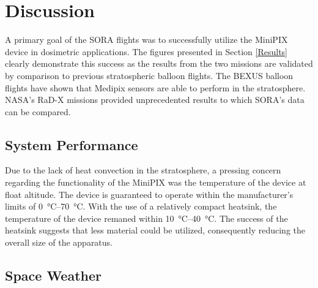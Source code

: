 \section{Discussion}
\label{Discussion}
A primary goal of the SORA flights was to successfully utilize the MiniPIX device in dosimetric applications.
The figures presented in Section \ref{Results} clearly demonstrate this success as the results from the two missions are validated by comparison to previous stratospheric balloon flights.
The BEXUS \cite{bexus} balloon flights have shown that Medipix sensors are able to perform in the stratosphere.
NASA's RaD-X missions \cite{rad-x} provided unprecedented results to which SORA's data can be compared.

\subsection{System Performance}
Due to the lack of heat convection in the stratosphere, a pressing concern regarding the functionality of the MiniPIX was the temperature of the device at float altitude. 
The device is guaranteed to operate within the manufacturer's limits of \SIrange{0}{70}{\celsius}.
With the use of a relatively compact heatsink, the temperature of the device remaned within \SIrange{10}{40}{\celsius}.
The success of the heatsink suggests that less material could be utilized, consequently reducing the overall size of the apparatus.

\subsection{Space Weather}

